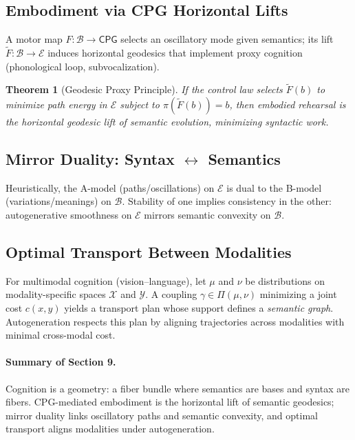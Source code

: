 \documentclass[12pt,a4paper,twoside,openright]{book}
\newtheorem{theorem}{Theorem}
\begin{document}
\subsection{Embodiment via CPG Horizontal Lifts}
A motor map $F:\mathcal{B}\to \mathsf{CPG}$ selects an oscillatory mode given semantics; its lift $\tilde F:\mathcal{B}\to\mathcal{E}$ induces horizontal geodesics that implement proxy cognition (phonological loop, subvocalization).

\begin{theorem}[Geodesic Proxy Principle]
If the control law selects $\tilde F(b)$ to minimize path energy in $\mathcal{E}$ subject to $\pi(\tilde F(b))=b$, then embodied rehearsal is the horizontal geodesic lift of semantic evolution, minimizing syntactic work.
\end{theorem}

\subsection{Mirror Duality: Syntax $\leftrightarrow$ Semantics}
Heuristically, the A-model (paths/oscillations) on $\mathcal{E}$ is dual to the B-model (variations/meanings) on $\mathcal{B}$.
Stability of one implies consistency in the other: autogenerative smoothness on $\mathcal{E}$ mirrors semantic convexity on $\mathcal{B}$.

\subsection{Optimal Transport Between Modalities}
For multimodal cognition (vision–language), let $\mu$ and $\nu$ be distributions on modality-specific spaces $\mathcal{X}$ and $\mathcal{Y}$.
A coupling $\gamma\in \Pi(\mu,\nu)$ minimizing a joint cost $c(x,y)$ yields a transport plan whose support defines a \emph{semantic graph}.
Autogeneration respects this plan by aligning trajectories across modalities with minimal cross-modal cost.

\paragraph{Summary of Section 9.}
Cognition is a geometry: a fiber bundle where semantics are bases and syntax are fibers.
CPG-mediated embodiment is the horizontal lift of semantic geodesics; mirror duality links oscillatory paths and semantic convexity, and optimal transport aligns modalities under autogeneration.

\end{document}
